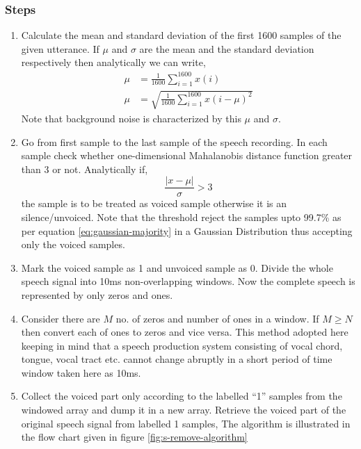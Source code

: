 \documentclass[12pt, a4paper, twoside]{report}
\begin{document}
\subsubsection{Steps}
\begin{enumerate}
\item Calculate the mean and standard deviation of the first 1600 samples of the given utterance. If $\mu$ and $\sigma$ are the mean and the standard deviation respectively then analytically we can write,
\begin{align*}
\mu &= \frac{1}{1600} \sum_{i=1}^{1600} x(i) \\
\mu &= \sqrt{\frac{1}{1600} \sum_{i=1}^{1600} x(i - \mu)^2}
\end{align*}
Note that background noise is characterized by this $\mu$ and $\sigma$.
\item Go from first sample to the last sample of the speech recording. In each sample check whether one-dimensional Mahalanobis distance function greater than 3 or not. Analytically if,
\begin{equation*}
\frac{|x - \mu |}{\sigma} > 3
\end{equation*}
the sample is to be treated as voiced sample otherwise it is an silence/unvoiced. Note that the threshold reject the samples upto 99.7\% as per equation \ref{eq:gaussian-majority} in a Gaussian Distribution thus accepting only the voiced samples.

\item Mark the voiced sample as 1 and unvoiced sample as 0. Divide the whole speech signal into 10ms non-overlapping windows. Now the complete speech is represented by only zeros and ones.

\item Consider there are $M$ no. of zeros and number of ones in a window. If $M \geq N$ then convert each of ones to zeros and vice versa. This method adopted here keeping in mind that a speech production system consisting of vocal chord, tongue, vocal tract etc. cannot change abruptly in a short period of time window taken here as 10ms.

\item Collect the voiced part only according to the labelled ``1'' samples from the windowed array and dump it in a new array. Retrieve the voiced part of the original speech signal from labelled 1 samples, The algorithm is illustrated in the flow chart given in figure \ref{fig:s-remove-algorithm}

\end{enumerate}
\end{document}
